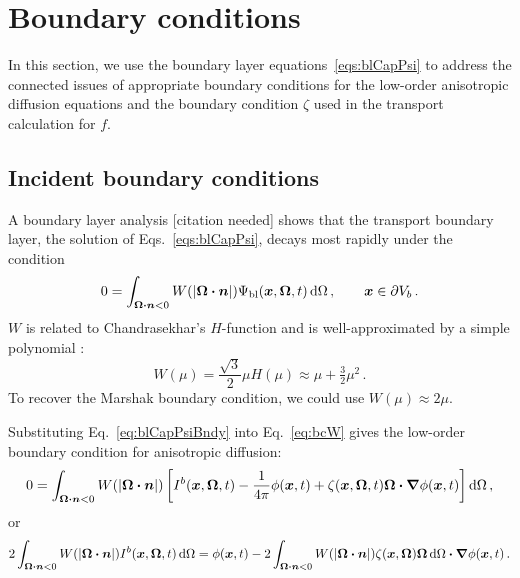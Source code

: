 \section{Boundary conditions}\label{sec:derBc}

In this section, we use the boundary layer equations~\eqref{eqs:blCapPsi} to
address the connected issues of appropriate boundary
conditions for the low-order anisotropic diffusion equations and the boundary
condition $\zeta$ used in the transport calculation for $f$.

\subsection{Incident boundary conditions}
A boundary layer analysis 
{\small [citation needed]}
shows that the transport boundary layer, the solution of
Eqs.~\eqref{eqs:blCapPsi}, decays most rapidly under the condition
\begin{equation} \label{eq:bcW}
  0 = \int_{\bm{\Omega} \bm{\cdot} \bm{n} < 0} W(\left| \bm{\Omega} \bm{\cdot} \bm{n} \right|)
  \Psi_\mathrm{bl} (\bm{x}, \bm{\Omega}, t) \mathop{}\!\mathrm{d} \Omega\,,\qquad \bm{x} \in
  \partial V_b\,.
\end{equation}
$W$ is related to Chandrasekhar's $H$-function \cite{Cha1960} and is
well-approximated by a simple polynomial \cite{Mal1991}:
\begin{equation} \label{eq:chandraW}
  W(\mu) = \frac{\sqrt{3}}{2} \mu H(\mu)
  \approx \mu + \tfrac{3}{2} \mu^2 \,.
\end{equation}
To recover the Marshak boundary condition, we could use $W(\mu) \approx 2 \mu$.

Substituting Eq.~\eqref{eq:blCapPsiBndy} into Eq.~\eqref{eq:bcW} gives the
low-order boundary condition for anisotropic diffusion:
\begin{equation*}
  0 = \int_{\bm{\Omega} \bm{\cdot} \bm{n} < 0} W(\left| \bm{\Omega} \bm{\cdot} \bm{n} \right|)
  \left[  I^b(\bm{x}, \bm{\Omega}, t) - \frac{1}{4\pi} \phi(\bm{x}, t)
  + \zeta(\bm{x}, \bm{\Omega}, t) \bm{\Omega}\bm{\cdot} \bm{\nabla} \phi(\bm{x}, t)
\right] \mathop{}\!\mathrm{d} \Omega \,,
\end{equation*}
or
\begin{equation} \label{eq:bcInc1}
  2\int_{\bm{\Omega}\bm{\cdot} \bm{n} < 0}
  W(\left| \bm{\Omega} \bm{\cdot} \bm{n} \right|) I^b(\bm{x}, \bm{\Omega}, t) \mathop{}\!\mathrm{d}\Omega
  = \phi(\bm{x}, t)
  - 2\int_{\bm{\Omega}\bm{\cdot} \bm{n} < 0} W(\left| \bm{\Omega} \bm{\cdot} \bm{n} \right|)
  \zeta(\bm{x}, \bm{\Omega}) \bm{\Omega} \mathop{}\!\mathrm{d}\Omega
  \bm{\cdot} \bm{\nabla} \phi(\bm{x}, t) \,.
\end{equation}


